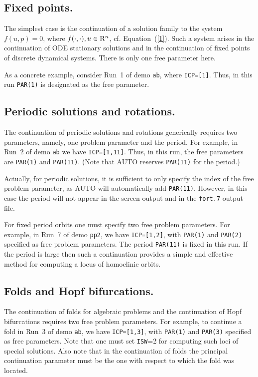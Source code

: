 \documentclass[12pt]{report}
\def\Rn{{\rm R}^n}
\begin{document}
\subsection{ Fixed points.}
The simplest case is the continuation of a solution family to the system
$ f( u , p ) = 0$,  where $f(\cdot,\cdot), u \in \Rn$, cf. Equation~(\ref{1}).
Such a system arises in the continuation of ODE stationary solutions and 
in the continuation of fixed points of discrete dynamical systems.
There is only one free parameter here.

As a concrete example, consider Run~1 of demo {\tt ab},
where {\tt ICP=[1]}. 
Thus, in this run {\tt PAR(1)} is designated as the free parameter.

\subsection{ Periodic solutions and rotations.}
The continuation of periodic solutions and rotations generically requires 
two parameters, namely, one problem parameter and the period.
For example, in Run~2 of demo {\tt ab} we have {\tt ICP=[1,11]}.
Thus, in this run, the free parameters are {\tt PAR(1)} and {\tt PAR(11)}.
(Note that {\cal AUTO} reserves {\tt PAR(11)} for the period.)

Actually, for periodic solutions, it is sufficient to only specify 
the index of the free problem parameter, as {\cal AUTO} will automatically 
add {\tt PAR(11)}.
However, in this case the period will not appear in the screen output 
and in the {\tt fort.7} output-file. 

For fixed period orbits one must specify two free problem 
parameters.
For example, in Run~7 of demo {\tt pp2}, we have {\tt ICP=[1,2]}, with 
{\tt PAR(1)} and {\tt PAR(2)}
specified as free problem parameters.
The period {\tt PAR(11)} is fixed in this run.
If the period is large then such a continuation provides a simple and 
effective method for computing a locus of homoclinic orbits.
\subsection{ Folds and Hopf bifurcations.}
The continuation of folds for algebraic problems and the continuation of
Hopf bifurcations requires two free problem parameters.
For example, to continue a fold in Run~3 of demo {\tt ab}, we have {\tt ICP=[1,3]}, 
with {\tt PAR(1)} and {\tt PAR(3)} specified as free parameters.
Note that one must set {\tt ISW}=2 for computing such loci of special solutions.
Also note that in the continuation of folds the principal continuation parameter
must be the one with respect to which the fold was located.
\end{document}

